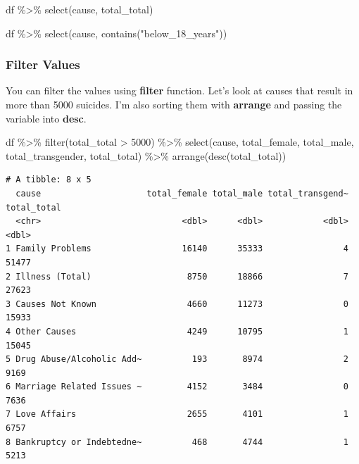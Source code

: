 \documentclass[
  letterpaper,
  DIV=11,
  numbers=noendperiod]{scrartcl}
\newenvironment{Shaded}{\begin{snugshade}}{\end{snugshade}}
\newcommand{\DecValTok}[1]{\textcolor[rgb]{0.68,0.00,0.00}{#1}}
\newcommand{\FunctionTok}[1]{\textcolor[rgb]{0.28,0.35,0.67}{#1}}
\newcommand{\NormalTok}[1]{\textcolor[rgb]{0.00,0.23,0.31}{#1}}
\newcommand{\SpecialCharTok}[1]{\textcolor[rgb]{0.37,0.37,0.37}{#1}}
\newcommand{\StringTok}[1]{\textcolor[rgb]{0.13,0.47,0.30}{#1}}
\begin{document}
\begin{Shaded}
\begin{Highlighting}[]
\NormalTok{df }\SpecialCharTok{\%\textgreater{}\%} 
   \FunctionTok{select}\NormalTok{(cause, total\_total)}
\end{Highlighting}
\end{Shaded}

\begin{Shaded}
\begin{Highlighting}[]
\NormalTok{df }\SpecialCharTok{\%\textgreater{}\%} 
   \FunctionTok{select}\NormalTok{(cause, }\FunctionTok{contains}\NormalTok{(}\StringTok{"below\_18\_years"}\NormalTok{))}
\end{Highlighting}
\end{Shaded}

\hypertarget{filter-values}{%
\subsubsection{Filter Values}\label{filter-values}}

You can filter the values using \textbf{filter} function. Let's look at
causes that result in more than 5000 suicides. I'm also sorting them
with \textbf{arrange} and passing the variable into \textbf{desc}.

\begin{Shaded}
\begin{Highlighting}[]
\NormalTok{df }\SpecialCharTok{\%\textgreater{}\%} 
   \FunctionTok{filter}\NormalTok{(total\_total }\SpecialCharTok{\textgreater{}} \DecValTok{5000}\NormalTok{) }\SpecialCharTok{\%\textgreater{}\%} 
   \FunctionTok{select}\NormalTok{(cause, total\_female, total\_male, total\_transgender, total\_total) }\SpecialCharTok{\%\textgreater{}\%} 
   \FunctionTok{arrange}\NormalTok{(}\FunctionTok{desc}\NormalTok{(total\_total))}
\end{Highlighting}
\end{Shaded}

\begin{verbatim}
# A tibble: 8 x 5
  cause                     total_female total_male total_transgend~ total_total
  <chr>                            <dbl>      <dbl>            <dbl>       <dbl>
1 Family Problems                  16140      35333                4       51477
2 Illness (Total)                   8750      18866                7       27623
3 Causes Not Known                  4660      11273                0       15933
4 Other Causes                      4249      10795                1       15045
5 Drug Abuse/Alcoholic Add~          193       8974                2        9169
6 Marriage Related Issues ~         4152       3484                0        7636
7 Love Affairs                      2655       4101                1        6757
8 Bankruptcy or Indebtedne~          468       4744                1        5213
\end{verbatim}
\end{document}
